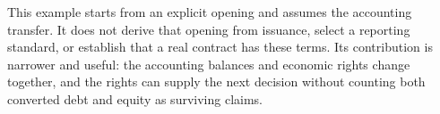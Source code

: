 This example starts from an explicit opening and assumes the accounting
transfer. It does not derive that opening from issuance, select a reporting
standard, or establish that a real contract has these terms. Its contribution
is narrower and useful: the accounting balances and economic rights change
together, and the rights can supply the next decision without counting both
converted debt and equity as surviving claims.
